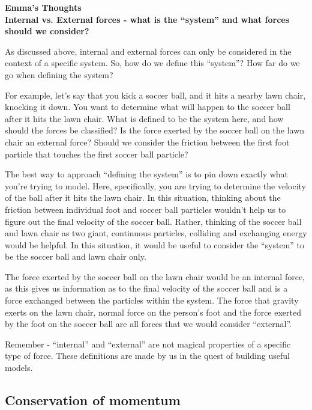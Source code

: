 \documentclass[9pt,arxiv,red]{lapreprint}
\begin{document}
\begin{framed}
\textbf{Emma's Thoughts}\\
\textbf{Internal vs. External forces - what is the ``system'' and what forces should we consider?}

As discussed above, internal and external forces can only be considered in the context of a specific system. So, how do we define this ``system''? How far do we go when defining the system?

For example, let's say that you kick a soccer ball, and it hits a nearby lawn chair, knocking it down. You want to determine what will happen to the soccer ball after it hits the lawn chair. What is defined to be the system here, and how should the forces be classified? Is the force exerted by the soccer ball on the lawn chair an external force? Should we consider the friction between the first foot particle that touches the first soccer ball particle?

The best way to approach ``defining the system'' is to pin down exactly what you're trying to model. Here, specifically, you are trying to determine the velocity of the ball after it hits the lawn chair. In this situation, thinking about the friction between individual foot and soccer ball particles wouldn't help us to figure out the final velocity of the soccer ball. Rather, thinking of the soccer ball and lawn chair as two giant, continuous particles, colliding and exchanging energy would be helpful. In this situation, it would be useful to consider the ``system'' to be the soccer ball and lawn chair only.

The force exerted by the soccer ball on the lawn chair would be an internal force, as this gives us information as to the final velocity of the soccer ball and is a force exchanged between the particles within the system. The force that gravity exerts on the lawn chair, normal force on the person's foot and the force exerted by the foot on the soccer ball are all forces that we would consider ``external''.

Remember - ``internal'' and ``external'' are not magical properties of a specific type of force. These definitions are made by us in the quest of building useful models.
\end{framed}

\subsection{Conservation of momentum}
\end{document}
